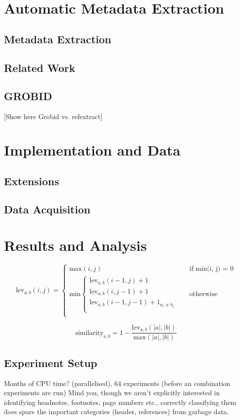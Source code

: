 \documentclass[10pt, oneside]{scrartcl}   	%
\begin{document}
\section{Automatic Metadata Extraction}
\subsection{Metadata Extraction}
\subsection{Related Work}
\subsection{GROBID}
[Show here Grobid vs. refextract]
\section{Implementation and Data}
\subsection{Extensions}
\subsection{Data Acquisition}
\section{Results and Analysis}
\[
  \text{lev}_{a, b}(i, j) = 
  \begin{cases} 
  	\text{max}(i, j) &\quad\text{if min(i, j) = 0} \\
	\text{min}
		\begin{cases}
			\text{lev}_{a, b}(i - 1, j) + 1 \\
			\text{lev}_{a, b}(i, j - 1) + 1 \\
			\text{lev}_{a, b}(i - 1, j - 1) + 1_{a_i \neq b_j} \\
		\end{cases} &\quad\text{otherwise} \\
  \end{cases}
\]

$$\text{similarity}_{a, b} =1 - \frac{\text{lev}_{a, b}(|a|, |b|)}{\text{max}(|a|, |b|)}$$

\subsection{Experiment Setup}
Months of CPU time? (parallelised), 64 experiments (before an combination experiments are run)
Mind you, though we aren't explicitly interested in identifying headnotes, footnotes, page numbers etc., correctly classifying them does spare the important categories (header, references) from garbage data.
\end{document}
